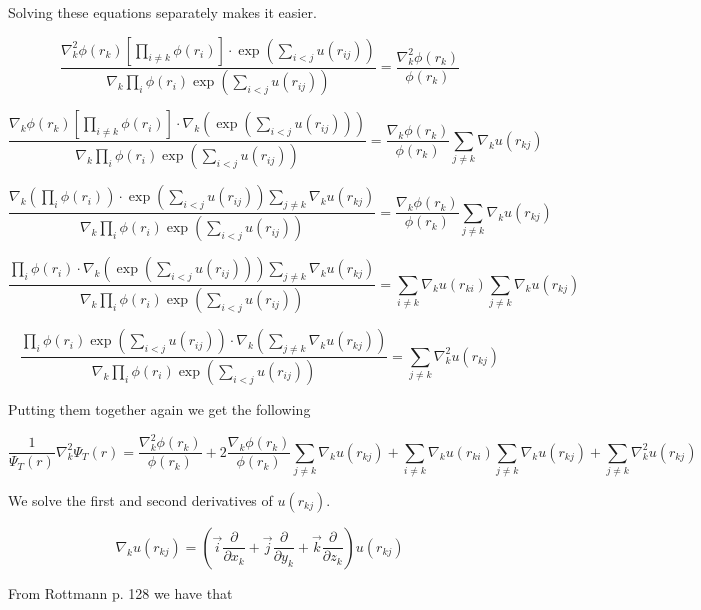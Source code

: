 \documentclass[a4paper,10pt,twoside]{report}
\begin{document}
Solving these equations separately makes it easier.

$$\frac{\nabla_k^2 \phi(r_k) \left[\prod_{i\ne k} \phi(r_i)\right]  \cdot \exp \left(\sum_{i<j}u(r_{ij})\right)}{\nabla_k \prod_{i} \phi (r_i) \exp \left(\sum_{i<j}u(r_{ij})\right)} = \frac{\nabla_k^2 \phi(r_k)}{\phi(r_k)}$$

$$\frac{\nabla_k \phi(r_k) \left[\prod_{i\ne k} \phi(r_i)\right] \cdot \nabla_k \left( \exp \left(\sum_{i<j}u(r_{ij})\right)\right)}{\nabla_k \prod_{i} \phi (r_i) \exp \left(\sum_{i<j}u(r_{ij})\right)} = \frac{\nabla_k \phi(r_k)}{\phi(r_k)} \sum_{j \ne k} \nabla_k u(r_{kj})$$

$$\frac{\nabla_k \left( \prod_{i} \phi (r_i) \right) \cdot \exp \left(\sum_{i<j}u(r_{ij})\right) \sum_{j\ne k} \nabla_k u(r_{kj})}{\nabla_k \prod_{i} \phi (r_i) \exp \left(\sum_{i<j}u(r_{ij})\right)} = \frac{\nabla_k \phi(r_k)}{\phi(r_k)} \sum_{j \ne k} \nabla_k u(r_{kj})$$

$$\frac{\prod_{i} \phi (r_i) \cdot \nabla_k \left(\exp \left(\sum_{i<j}u(r_{ij})\right)\right) \sum_{j\ne k} \nabla_k u(r_{kj})}{\nabla_k \prod_{i} \phi (r_i) \exp \left(\sum_{i<j}u(r_{ij})\right)} =  \sum_{i \ne k} \nabla_k u(r_{ki}) \sum_{j \ne k} \nabla_k u(r_{kj})$$

$$\frac{\prod_{i} \phi (r_i) \exp \left(\sum_{i<j}u(r_{ij})\right) \cdot \nabla_k \left(\sum_{j\ne k} \nabla_k u(r_{kj}) \right)}{\nabla_k \prod_{i} \phi (r_i) \exp \left(\sum_{i<j}u(r_{ij})\right)} = \sum_{j \ne k} \nabla_k^2 u(r_{kj})$$

Putting them together again we get the following

\begin{equation} \label{eq:local energy 2}
\frac{1}{\Psi_T(r)}\nabla_k^2 \Psi_T(r) = \frac{\nabla_k^2 \phi(r_k)}{\phi(r_k)} + 2\frac{\nabla_k \phi(r_k)}{\phi(r_k)} \sum_{j \ne k} \nabla_k u(r_{kj}) + \sum_{i \ne k} \nabla_k u(r_{ki}) \sum_{j \ne k} \nabla_k u(r_{kj}) + \sum_{j \ne k} \nabla_k^2 u(r_{kj})
\end{equation}


We solve the first and second derivatives of $u(r_{kj})$.

\begin{equation} \label{first der}
\nabla_k u(r_{kj}) = \left(\vec{i} \frac{\partial}{\partial x_k} + \vec{j} \frac{\partial}{\partial y_k} + \vec{k} \frac{\partial}{\partial z_k}\right) u(r_{kj})
\end{equation}

From Rottmann p. 128 we have that
\end{document}
